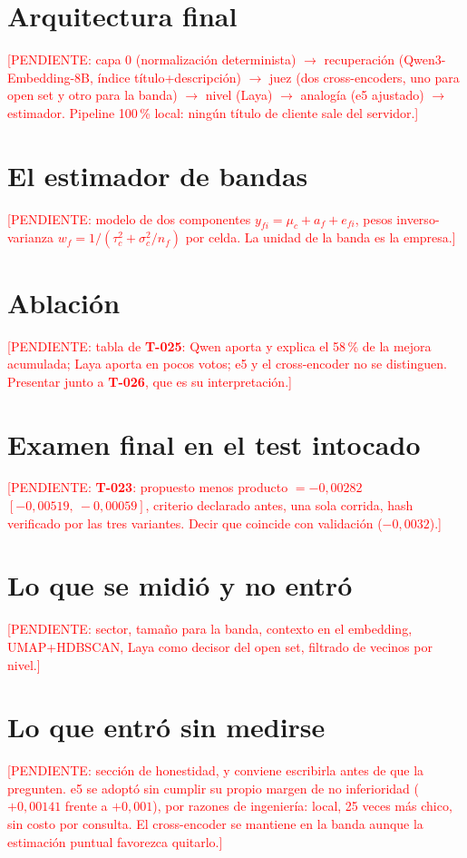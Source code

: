 \documentclass[12pt,a4paper,oneside]{report}
\newcommand{\pend}[1]{\textcolor{red}{\small[PENDIENTE: #1]}}
\newcommand{\tref}[1]{\textbf{T-#1}}
\begin{document}
\section{Arquitectura final}
\pend{capa 0 (normalización determinista) $\to$ recuperación (Qwen3-Embedding-8B, índice
título+descripción) $\to$ juez (dos cross-encoders, uno para open set y otro para la banda)
$\to$ nivel (Laya) $\to$ analogía (e5 ajustado) $\to$ estimador. Pipeline 100\,\% local:
ningún título de cliente sale del servidor.}

\section{El estimador de bandas}
\pend{modelo de dos componentes $y_{fi} = \mu_c + a_f + e_{fi}$, pesos inverso-varianza
$w_f = 1/(\tau_c^2 + \sigma_c^2/n_f)$ por celda. La unidad de la banda es la empresa.}

\section{Ablación}
\pend{tabla de \tref{025}: Qwen aporta y explica el 58\,\% de la mejora acumulada; Laya
aporta en pocos votos; e5 y el cross-encoder no se distinguen. Presentar junto a
\tref{026}, que es su interpretación.}

\section{Examen final en el test intocado}
\pend{\tref{023}: propuesto menos producto $= -0{,}00282$ $[-0{,}00519,\ -0{,}00059]$,
criterio declarado antes, una sola corrida, hash verificado por las tres variantes. Decir
que coincide con validación ($-0{,}0032$).}

\section{Lo que se midió y no entró}
\pend{sector, tamaño para la banda, contexto en el embedding, UMAP+HDBSCAN, Laya como
decisor del open set, filtrado de vecinos por nivel.}

\section{Lo que entró sin medirse}
\pend{sección de honestidad, y conviene escribirla antes de que la pregunten. e5 se adoptó
sin cumplir su propio margen de no inferioridad ($+0{,}00141$ frente a $+0{,}001$), por
razones de ingeniería: local, 25 veces más chico, sin costo por consulta. El cross-encoder
se mantiene en la banda aunque la estimación puntual favorezca quitarlo.}
\end{document}
